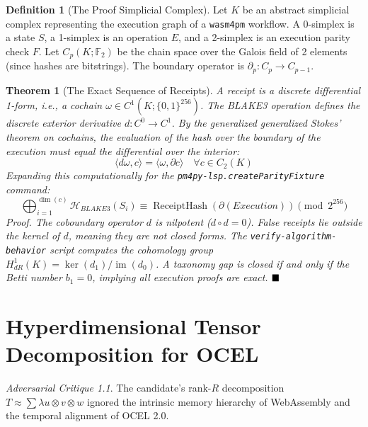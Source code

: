 \documentclass[11pt,a4paper]{book}
\theoremstyle{definition}
\newtheorem{definition}{Definition}[section]
\theoremstyle{plain}
\newtheorem{theorem}{Theorem}[section]
\theoremstyle{remark}
\newtheorem{critique}{Adversarial Critique}[section]
\begin{document}
\begin{definition}[The Proof Simplicial Complex]
Let $K$ be an abstract simplicial complex representing the execution graph of a \texttt{wasm4pm} workflow. A 0-simplex is a state $S$, a 1-simplex is an operation $E$, and a 2-simplex is an execution parity check $F$.
Let $C_p(K; \mathbb{F}_2)$ be the chain space over the Galois field of 2 elements (since hashes are bitstrings).
The boundary operator is $\partial_p: C_p \to C_{p-1}$.
\end{definition}

\begin{theorem}[The Exact Sequence of Receipts]
A receipt is a discrete differential 1-form, i.e., a cochain $\omega \in C^1(K; \{0,1\}^{256})$. The BLAKE3 operation defines the discrete exterior derivative $d: C^0 \to C^1$.
By the generalized generalized Stokes' theorem on cochains, the evaluation of the hash over the boundary of the execution must equal the differential over the interior:
\begin{equation}
\langle d\omega, c \rangle = \langle \omega, \partial c \rangle \quad \forall c \in C_2(K)
\end{equation}
Expanding this computationally for the \texttt{pm4py-lsp.createParityFixture} command:
\begin{equation}
\bigoplus_{i=1}^{\operatorname{dim}(c)} \mathcal{H}_{BLAKE3}(S_i) \equiv \operatorname{ReceiptHash}( \partial(Execution) ) \pmod{2^{256}}
\end{equation}
\textit{Proof.} The coboundary operator $d$ is nilpotent ($d \circ d = 0$). False receipts lie outside the kernel of $d$, meaning they are not closed forms. The \texttt{verify-algorithm-behavior} script computes the cohomology group $H^1_{dR}(K) = \ker(d_1) / \operatorname{im}(d_0)$. A taxonomy gap is closed if and only if the Betti number $b_1 = 0$, implying all execution proofs are exact. $\hfill\blacksquare$
\end{theorem}

\chapter{Hyperdimensional Tensor Decomposition for OCEL}
\begin{critique}
The candidate's rank-$R$ decomposition $T \approx \sum \lambda u \otimes v \otimes w$ ignored the intrinsic memory hierarchy of WebAssembly and the temporal alignment of OCEL 2.0.
\end{critique}
\end{document}
